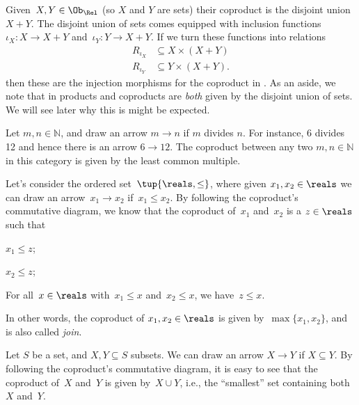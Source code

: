 \begin{example}
Given~$X,Y\in \Ob_\Rel$ (so $X$ and $Y$ are sets) their coproduct is the disjoint union~$X+Y$. The disjoint union of sets comes equipped with inclusion functions~$\iota_X\colon X\to X+Y$ and~$\iota_Y\colon Y\to X+Y$. If we turn these functions into relations
\begin{equation*}
\begin{aligned}
    R_{\iota_X}&\subseteq X\times (X+Y)\\
    R_{\iota_Y}&\subseteq Y\times (X+Y).
\end{aligned}
\end{equation*}
then these are the injection morphisms for the coproduct in \Rel.
As an aside, we note that in \Rel products and coproducts are \emph{both} given by the disjoint union of sets. We will see later why this is might be expected.
\end{example}

\begin{example}
Let $m,n\in \mathbb{N}$, and draw an arrow $m\to n$ if $m$ divides $n$. For instance, 6 divides 12 and hence there is an arrow $6\to 12$. The coproduct between any two $m,n\in \mathbb{N}$ in this category is given by the least common multiple.
\end{example}

\begin{example}
Let's consider the ordered set~$\tup{\reals,\leq}$, where given $x_1,x_2\in \reals$ we can draw an arrow~$x_1\to x_2$ if~$x_1\leq x_2$. By following the coproduct's commutative diagram, we know that the coproduct of~$x_1$ and~$x_2$ is a $z\in \reals$ such that
\begin{compactitem}
\item $x_1\leq z$;
\item $x_2\leq z$;
\item For all~$x\in \reals$ with~$x_1\leq x$ and~$x_2\leq x$, we have~$z\leq x$.
\end{compactitem}
In other words, the coproduct of $x_1,x_2\in \reals$ is given by~$\max\{x_1,x_2\}$, and is also called \emph{join}.
\end{example}

\begin{example}
\label{ex:subset_coprod}
Let $S$ be a set, and $X,Y\subseteq S$ subsets. We can draw an arrow $X\to Y$ if $X\subseteq Y$. By following the coproduct's commutative diagram, it is easy to see that the coproduct of~$X$ and~$Y$ is given by~$X\cup Y$, i.e., the ``smallest'' set containing both~$X$ and~$Y$.
\end{example}

